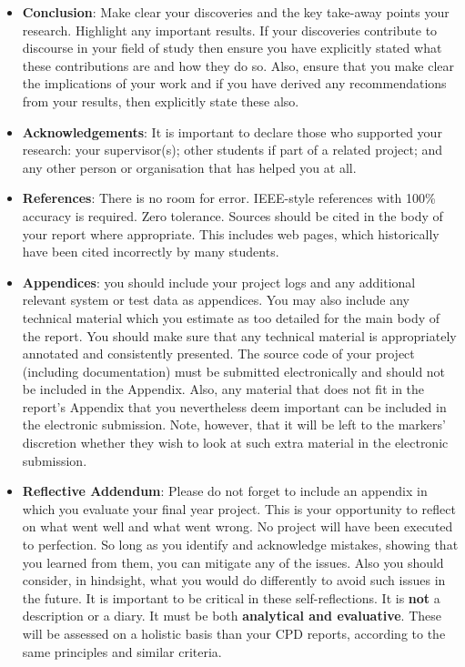 \begin{itemize}
\item \textbf{Conclusion}: Make clear your discoveries and the key take-away points your research. Highlight any important results. If your discoveries contribute to discourse in your field of study then ensure you have explicitly stated what these contributions are and how they do so. Also, ensure that you make clear the implications of your work and if you have derived any recommendations from your results, then explicitly state these also. 

\item \textbf{Acknowledgements}: It is important to declare those who supported your research: your supervisor(s); other students if part of a related project; and any other person or organisation that has helped you at all.

\item \textbf{References}: There is no room for error. IEEE-style references with 100\% accuracy is required. Zero tolerance. Sources should be cited in the body of your report where appropriate. This includes web pages, which historically have been cited incorrectly by many students.

\item \textbf{Appendices}: you should include your project logs and any additional relevant system or test data as appendices. You may also include any technical material which you estimate as too detailed for the main body of the report. You should make sure that any technical material is appropriately annotated and consistently presented. The source code of your project (including documentation) must be submitted electronically and should not be included in the Appendix. Also, any material that does not fit in the report's Appendix that you nevertheless deem important can be included in the electronic submission. Note, however, that it will be left to the markers' discretion whether they wish to look at such extra material in the electronic submission.

\item \textbf{Reflective Addendum}: Please do not forget to include an appendix in which you evaluate your final year project. This is your opportunity to reflect on what went well and what went wrong. No project will have been executed to perfection. So long as you identify and acknowledge mistakes, showing that you learned from them, you can mitigate any of the issues. Also you should consider, in hindsight, what you would do differently to avoid such issues in the future. It is important to be critical in these self-reflections. It is \textbf{not} a description or a diary. It must be both \textbf{analytical and evaluative}. These will be assessed on a holistic basis than your CPD reports, according to the same principles and similar criteria. 

\end{itemize}

